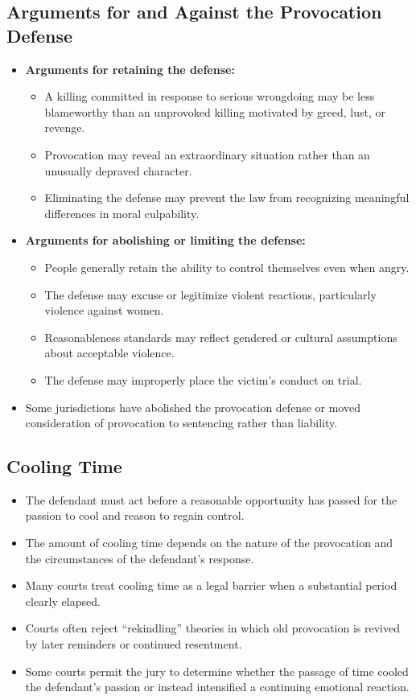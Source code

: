 \documentclass[11pt]{tex/lawoutline}
\begin{document}
\subsection{Arguments for and Against the Provocation Defense}
{
\begin{itemize}
    \item \textbf{Arguments for retaining the defense:}
    \begin{itemize}
        \item A killing committed in response to serious wrongdoing may be less blameworthy than an unprovoked killing motivated by greed, lust, or revenge.
        \item Provocation may reveal an extraordinary situation rather than an unusually depraved character.
        \item Eliminating the defense may prevent the law from recognizing meaningful differences in moral culpability.
    \end{itemize}

    \item \textbf{Arguments for abolishing or limiting the defense:}
    \begin{itemize}
        \item People generally retain the ability to control themselves even when angry.
        \item The defense may excuse or legitimize violent reactions, particularly violence against women.
        \item Reasonableness standards may reflect gendered or cultural assumptions about acceptable violence.
        \item The defense may improperly place the victim's conduct on trial.
    \end{itemize}

    \item Some jurisdictions have abolished the provocation defense or moved consideration of provocation to sentencing rather than liability.
\end{itemize}
}

\subsection{Cooling Time}

\begin{itemize}
    \item The defendant must act before a reasonable opportunity has passed for the passion to cool and reason to regain control.
    \item The amount of cooling time depends on the nature of the provocation and the circumstances of the defendant's response.
    \item Many courts treat cooling time as a legal barrier when a substantial period clearly elapsed.
    \item Courts often reject ``rekindling'' theories in which old provocation is revived by later reminders or continued resentment.
    \item Some courts permit the jury to determine whether the passage of time cooled the defendant's passion or instead intensified a continuing emotional reaction.
\end{itemize}
\end{document}
